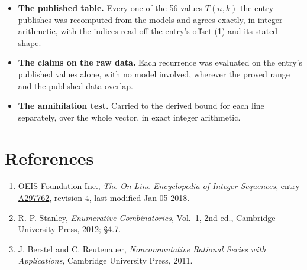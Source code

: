 \documentclass[11pt]{article}
\theoremstyle{definition}
\begin{document}
\begin{itemize}

\item {\bfseries The published table.} Every one of the 56 values $T(n,k)$ the entry publishes was recomputed from the models and agrees exactly, in integer arithmetic, with the indices read off the entry's offset (1) and its stated shape.

\item {\bfseries The claims on the raw data.} Each recurrence was evaluated on the entry's published values alone, with no model involved, wherever the proved range and the published data overlap.

\item {\bfseries The annihilation test.} Carried to the derived bound for each line separately, over the whole vector, in exact integer arithmetic.

\end{itemize}

\section{References}

\begin{enumerate}

\item OEIS Foundation Inc., \emph{The On-Line Encyclopedia of Integer Sequences}, entry \href{https://oeis.org/A297762}{A297762}, revision 4, last modified Jan 05 2018.

\item R. P. Stanley, \emph{Enumerative Combinatorics}, Vol.~1, 2nd ed., Cambridge University Press, 2012; \S4.7.

\item J. Berstel and C. Reutenauer, \emph{Noncommutative Rational Series with Applications}, Cambridge University Press, 2011.

\end{enumerate}
\end{document}
